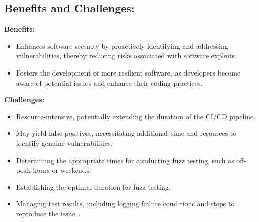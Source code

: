 \subsection*{Benefits and Challenges:}
\textbf{Benefits:}~\cite{liang2018fuzz}~\cite{klees2018evaluating} \\
\begin{itemize}
    \item Enhances software security by proactively identifying and addressing vulnerabilities, thereby reducing risks associated with software exploits.
    \item Fosters the development of more resilient software, as developers become aware of potential issues and enhance their coding practices\cite{HowCICDI34:online}.
\end{itemize}

\textbf{Challenges:}~\cite{liang2018fuzz}~\cite{klees2018evaluating} \\
\begin{itemize}
    \item Resource-intensive, potentially extending the duration of the CI/CD pipeline.
    \item May yield false positives, necessitating additional time and resources to identify genuine vulnerabilities.
    \item Determining the appropriate times for conducting fuzz testing, such as off-peak hours or weekends.
    \item Establishing the optimal duration for fuzz testing.
    \item Managing test results, including logging failure conditions and steps to reproduce the issue~\cite{FuzzingC40:online}.
\end{itemize}


\clearpage
